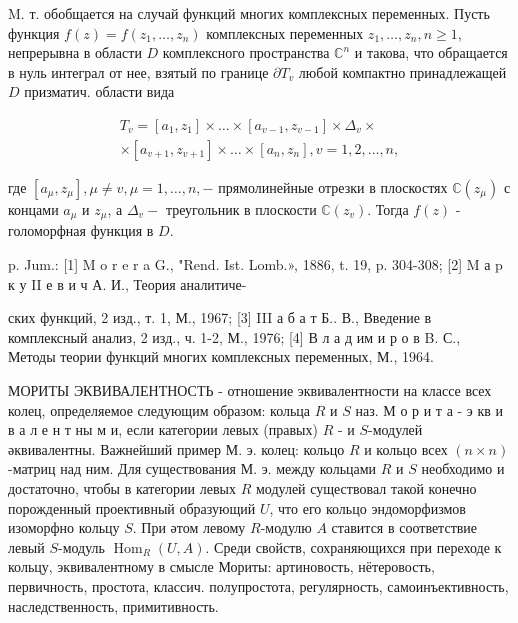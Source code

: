 \documentclass[10pt]{article}
\begin{document}
M. т. обобщается на случай функций многих комплексных переменных. Пусть функция $f(z)=f\left(z_{1}, \ldots, z_{n}\right)$ комплексных переменных $z_{1}, \ldots, z_{n}, n \geqslant 1$, непрерывна в области $D$ комплексного пространства $\mathbb{C}^{n}$ и такова, что обращается в нуль интеграл от нее, взятый по границе $\partial T_{v}$ любой компактно принадлежащей $D$ призматич. области вида



\[

\begin{gathered}

T_{v}=\left[a_{1}, z_{1}\right] \times \ldots \times\left[a_{v-1}, z_{v-1}\right] \times \Delta_{v} \times \\

\times\left[a_{v+1}, z_{v+1}\right] \times \ldots \times\left[a_{n}, z_{n}\right], v=1,2, \ldots, n,

\end{gathered}

\]



где $\left[a_{\mu}, z_{\mu}\right], \mu \neq v, \mu=1, \ldots, n,-$ прямолинейные отрезки в плоскостях $\mathbb{C}\left(z_{\mu}\right)$ с концами $a_{\mu}$ и $z_{\mu}$, а $\Delta_{v}-$ треугольник в плоскости $\mathbb{C}\left(z_{v}\right)$. Тогда $f(z)$ - голоморфная функция в $D$.



p. Jum.: [1] M o r e r a G., "Rend. Ist. Lomb.», 1886, t. 19, p. 304-308; [2] M а p к у II е в и ч А. И., Теория аналитиче-

ских функций, 2 изд., т. 1, М., 1967; [3] III а б а т Б.. В., Введение в комплексный анализ, 2 изд., ч. 1-2, М., 1976; [4] В л а д им и р о в B. С., Методы теории функций многих комплексных переменных, М., 1964.



МОРИТЫ ЭКВИВАЛЕНТНОСТЬ - отношение эквивалентности на классе всех колец, определяемое следующим образом: кольца $R$ и $S$ наз. М о р и т а - э кв и в а л е н т ны м и, если категории левых (правых) $R$ - и $S$-модулей әквивалентны. Важнейший пример М. э. колец: кольцо $R$ и кольцо всех $(n \times n)$-матриц над ним. Для существования М. э. между кольцами $R$ и $S$ необходимо и достаточно, чтобы в категории левых $R$ модулей существовал такой конечно порожденный проективный образующий $U$, что его кольцо эндоморфизмов изоморфно кольцу $S$. При әтом левому $R$-модулю $A$ ставится в соответствие левый $S$-модуль $\operatorname{Hom}_{R}(U, A)$. Среди свойств, сохраняющихся при переходе к кольцу, эквивалентному в смысле Мориты: артиновость, нётеровость, первичность, простота, классич. полупростота, регулярность, самоинъективность, наследственность, примитивность.
\end{document}
